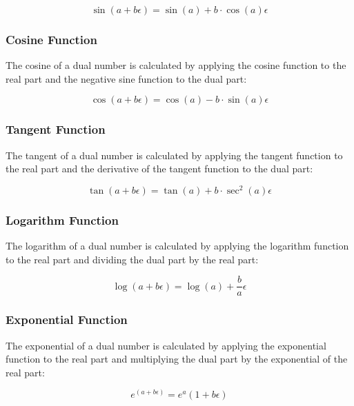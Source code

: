 \begin{equation}
    \sin(a + b\epsilon) = \sin(a) + b \cdot \cos(a)\epsilon
    \label{eq:sine}
\end{equation}

\subsubsection{Cosine Function}
The cosine of a dual number is calculated by applying the cosine function to the real part and the negative sine function to the dual part:

\begin{equation}
    \cos(a + b\epsilon) = \cos(a) - b \cdot \sin(a)\epsilon
    \label{eq:cosine}
\end{equation}

\subsubsection{Tangent Function}
The tangent of a dual number is calculated by applying the tangent function to the real part and the derivative of the tangent function to the dual part:

\begin{equation}
    \tan(a + b\epsilon) = \tan(a) + b \cdot \sec^2(a)\epsilon
    \label{eq:tangent}
\end{equation}

\subsubsection{Logarithm Function}
The logarithm of a dual number is calculated by applying the logarithm function to the real part and dividing the dual part by the real part:

\begin{equation}
    \log(a + b\epsilon) = \log(a) + \frac{b}{a}\epsilon
    \label{eq:logarithm}
\end{equation}

\subsubsection{Exponential Function}
The exponential of a dual number is calculated by applying the exponential function to the real part and multiplying the dual part by the exponential of the real part:

\begin{equation}
    e^{(a + b\epsilon)} = e^a \left(1 + b\epsilon\right)
    \label{eq:exponential}
\end{equation}

